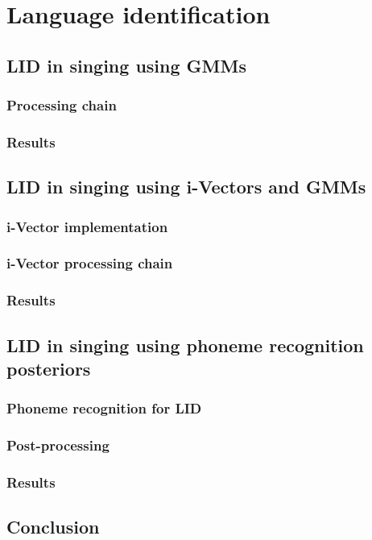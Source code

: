 \chapter{Language identification} \label{chap:langid}
\section{LID in singing using GMMs}
\subsection{Processing chain}
\subsection{Results}
\section{LID in singing using i-Vectors and GMMs}
\subsection{i-Vector implementation}
\subsection{i-Vector processing chain}
\subsection{Results}
\section{LID in singing using phoneme recognition posteriors}
\subsection{Phoneme recognition for LID}
\subsection{Post-processing}
\subsection{Results}
\section{Conclusion}
